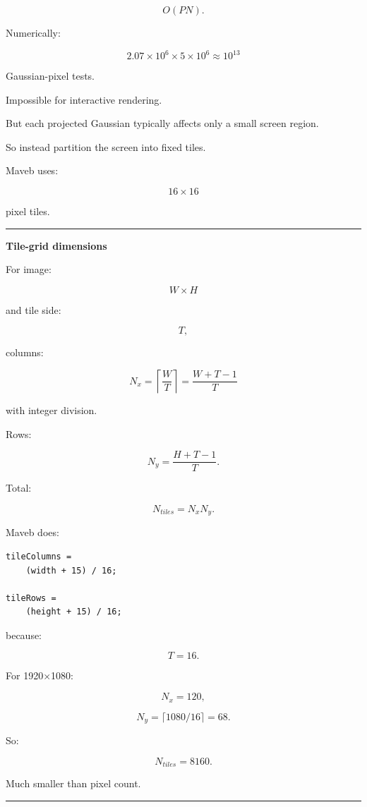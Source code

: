 \[
O(PN).
\]

Numerically:

\[
2.07\times10^6
\times
5\times10^6
\approx
10^{13}
\]

Gaussian-pixel tests.

Impossible for interactive rendering.

But each projected Gaussian typically affects only a small screen region.

So instead partition the screen into fixed tiles.

Maveb uses:

\[
\boxed{16\times16}
\]

pixel tiles.

\begin{center}\rule{0.5\linewidth}{0.5pt}\end{center}

\textbf{Tile-grid dimensions}

For image:

\[
W\times H
\]

and tile side:

\[
T,
\]

columns:

\[
\boxed{
N_x
=
\left\lceil
\frac WT
\right\rceil
=
\frac{W+T-1}{T}
}
\]

with integer division.

Rows:

\[
\boxed{
N_y
=
\frac{H+T-1}{T}.
}
\]

Total:

\[
N_{tiles}=N_xN_y.
\]

Maveb does:

\begin{verbatim}
tileColumns =
    (width + 15) / 16;

tileRows =
    (height + 15) / 16;
\end{verbatim}

because:

\[
T=16.
\]

For 1920×1080:

\[
N_x=120,
\]

\[
N_y=
\lceil1080/16\rceil
=
68.
\]

So:

\[
N_{tiles}=8160.
\]

Much smaller than pixel count.

\begin{center}\rule{0.5\linewidth}{0.5pt}\end{center}

